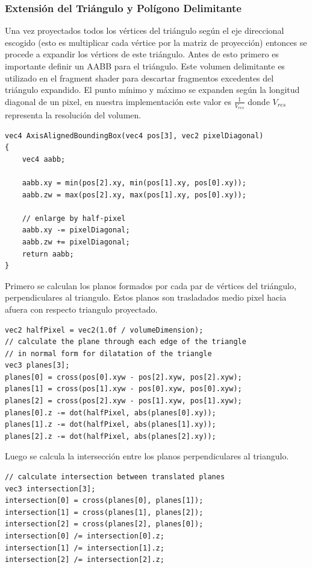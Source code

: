 \subsubsection{Extensión del Triángulo y Polígono Delimitante}
Una vez proyectados todos los vértices del triángulo según el eje direccional escogido (esto es multiplicar cada vértice por la matriz de proyección) entonces se procede a expandir los vértices de este triángulo. Antes de esto primero es importante definir un \ac{AABB} para el triángulo. Este volumen delimitante es utilizado en el fragment shader para descartar fragmentos excedentes del triángulo expandido. El punto mínimo y máximo se expanden según la longitud diagonal de un pixel, en nuestra implementación este valor es $\frac{1}{V_{res}}$ donde $V_{res}$ representa la resolución del volumen.
\\
\begin{lstlisting}[caption={Creación de un \ac{AABB} para el triángulo proyectado.}, label=AxisAlignedBoundingBox]
vec4 AxisAlignedBoundingBox(vec4 pos[3], vec2 pixelDiagonal)
{
	vec4 aabb;

	aabb.xy = min(pos[2].xy, min(pos[1].xy, pos[0].xy));
	aabb.zw = max(pos[2].xy, max(pos[1].xy, pos[0].xy));

	// enlarge by half-pixel
	aabb.xy -= pixelDiagonal;
	aabb.zw += pixelDiagonal;
	return aabb;
}
\end{lstlisting}

Primero se calculan los planos formados por cada par de vértices del triángulo, perpendiculares al triangulo. Estos planos son trasladados medio pixel hacia afuera con respecto triangulo proyectado.
\\
\begin{lstlisting}[caption={Planos por cada par de vértices del triángulo proyectado.}, label=TPlanes]
vec2 halfPixel = vec2(1.0f / volumeDimension);
// calculate the plane through each edge of the triangle
// in normal form for dilatation of the triangle
vec3 planes[3];
planes[0] = cross(pos[0].xyw - pos[2].xyw, pos[2].xyw);
planes[1] = cross(pos[1].xyw - pos[0].xyw, pos[0].xyw);
planes[2] = cross(pos[2].xyw - pos[1].xyw, pos[1].xyw);
planes[0].z -= dot(halfPixel, abs(planes[0].xy));
planes[1].z -= dot(halfPixel, abs(planes[1].xy));
planes[2].z -= dot(halfPixel, abs(planes[2].xy));
\end{lstlisting}

Luego se calcula la intersección entre los planos perpendiculares al triangulo.
\\
\begin{lstlisting}[caption={Intersección entre planos perpendiculares al triangulo proyectado.}, label=TPlanes2]
// calculate intersection between translated planes
vec3 intersection[3];
intersection[0] = cross(planes[0], planes[1]);
intersection[1] = cross(planes[1], planes[2]);
intersection[2] = cross(planes[2], planes[0]);
intersection[0] /= intersection[0].z;
intersection[1] /= intersection[1].z;
intersection[2] /= intersection[2].z;
\end{lstlisting}

